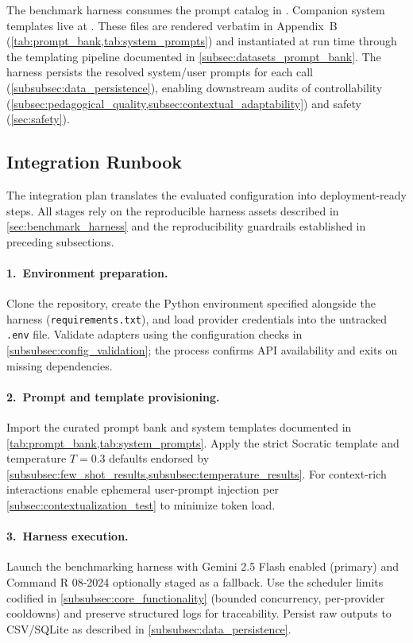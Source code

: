 The benchmark harness consumes the prompt catalog in . Companion system templates live at . These files are rendered verbatim in Appendix~B (\cref{tab:prompt_bank,tab:system_prompts}) and instantiated at run time through the templating pipeline documented in \cref{subsec:datasets_prompt_bank}. The harness persists the resolved system/user prompts for each call (\cref{subsubsec:data_persistence}), enabling downstream audits of controllability (\cref{subsec:pedagogical_quality,subsec:contextual_adaptability}) and safety (\cref{sec:safety}).

\subsection{Integration Runbook}
\label{subsec:integration_runbook}

The integration plan translates the evaluated configuration into deployment-ready steps. All stages rely on the reproducible harness assets described in \cref{sec:benchmark_harness} and the reproducibility guardrails established in preceding subsections.

\paragraph{1.~Environment preparation.} Clone the repository, create the Python environment specified alongside the harness (\texttt{requirements.txt}), and load provider credentials into the untracked \verb|.env| file. Validate adapters using the configuration checks in \cref{subsubsec:config_validation}; the process confirms API availability and exits on missing dependencies.

\paragraph{2.~Prompt and template provisioning.} Import the curated prompt bank and system templates documented in \cref{tab:prompt_bank,tab:system_prompts}. Apply the strict Socratic template and temperature $T=0.3$ defaults endorsed by \cref{subsubsec:few_shot_results,subsubsec:temperature_results}. For context-rich interactions enable ephemeral user-prompt injection per \cref{subsec:contextualization_test} to minimize token load.

\paragraph{3.~Harness execution.} Launch the benchmarking harness with Gemini 2.5 Flash enabled (primary) and Command R 08-2024 optionally staged as a fallback. Use the scheduler limits codified in \cref{subsubsec:core_functionality} (bounded concurrency, per-provider cooldowns) and preserve structured logs for traceability. Persist raw outputs to CSV/SQLite as described in \cref{subsubsec:data_persistence}.

